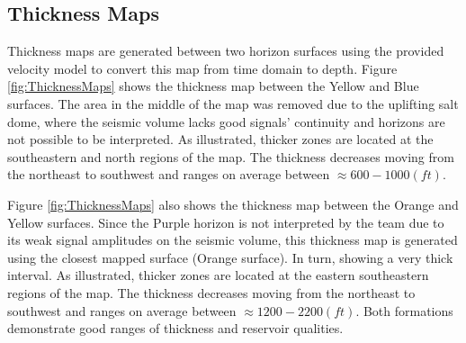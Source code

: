 \documentclass[fleqn]{article}
\begin{document}
\subsection{Thickness Maps}

Thickness maps are generated between two horizon surfaces using the provided velocity model to convert this map from time domain to depth.  Figure \ref{fig:ThicknessMaps} shows the thickness map between the Yellow and Blue surfaces. The area in the middle of the map was removed due to the uplifting salt dome, where the seismic volume lacks good signals’ continuity and horizons are not possible to be interpreted. As illustrated, thicker zones are located at the southeastern and north regions of the map. The thickness decreases moving from the northeast to southwest and ranges on average between $\approx 600 - 1000 (ft)$.

Figure \ref{fig:ThicknessMaps} also shows the thickness map between the Orange and Yellow surfaces. Since the Purple horizon is not interpreted by the team due to its weak signal amplitudes on the seismic volume, this thickness map is generated using the closest mapped surface (Orange surface). In turn, showing a very thick interval. As illustrated, thicker zones are located at the eastern southeastern regions of the map. The thickness decreases moving from the northeast to southwest and ranges on average between $\approx 1200 - 2200 (ft)$. Both formations demonstrate good ranges of thickness and  reservoir qualities.
\end{document}
